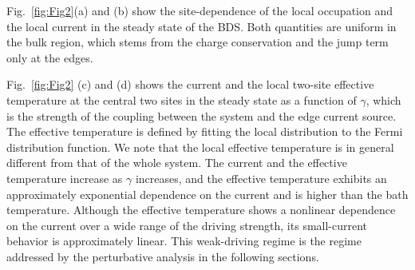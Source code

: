 \documentclass[a4paper, amsfonts, amssymb, amsmath, reprint, showkeys, nofootinbib, twoside,superscriptaddress, prl]{revtex4-2}
\newcommand{\m}[1]{\mathcal{#1}}
\newcommand{\mr}[1]{\mathrm{#1}}
\begin{document}
Fig.~\ref{fig:Fig2}(a) and (b) show the site-dependence of the local occupation and the local current in the steady state of the BDS. Both quantities are uniform in the bulk region, which stems from the charge conservation and the jump term only at the edges.

Fig.~\ref{fig:Fig2} (c) and (d) shows the current and the local two-site effective temperature at the central two sites in the steady state as a function of $\gamma$, which is the strength of the coupling between the system and the edge current source. The effective temperature is defined by fitting the local distribution to the Fermi distribution function. We note that the local effective temperature is in general different from that of the whole system. The current and the effective temperature increase as $\gamma$ increases, and the effective temperature exhibits an approximately exponential dependence on the current and is higher than the bath temperature. Although the effective temperature shows a nonlinear dependence on the current over a wide range of the driving strength, its small-current behavior is approximately linear. This weak-driving regime is the regime addressed by the perturbative analysis in the following sections. 
 
\end{document}

